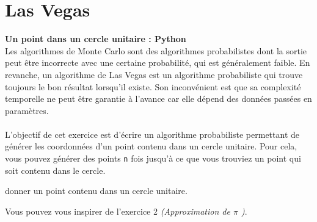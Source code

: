 \begin{Exercice}[15 minutes]
    \begin{solution}
        
    \end{solution}
\end{Exercice}

\newpage
\section{Las Vegas}

\begin{Exercice}[10 minutes]\textbf{Un point dans un cercle unitaire : Python} \optionnel\\
    Les algorithmes de Monte Carlo sont des algorithmes probabilistes dont la sortie peut être incorrecte avec une certaine probabilité, qui est généralement faible. En revanche, un algorithme de Las Vegas est un algorithme probabiliste qui trouve toujours le bon résultat lorsqu'il existe. Son inconvénient est que sa complexité temporelle ne peut être garantie à l'avance car elle dépend des données passées en paramètres.\\ \\
    L'objectif de cet exercice est d'écrire un algorithme probabiliste permettant de générer les coordonnées d'un point contenu dans un cercle unitaire. Pour cela, vous pouvez générer des points \lstinline{n} fois jusqu'à ce que vous trouviez un point qui soit contenu dans le cercle.
    
    
    donner un point contenu dans un cercle unitaire. 
    
    \begin{conseil}
       Vous pouvez vous inspirer de l'exercice 2 \textit{(Approximation de $\pi$ )}.
    \end{conseil}
    \begin{solution}
     
    \end{solution}
    \end{Exercice}

